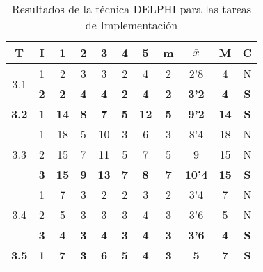 \documentclass[11pt,a4paper,spanish,twoside]{report}
\begin{document}
\begin{table}[!h]
\centering
  \begin{tabular}{|c|c||c|c|c|c|c||c|c|c||c|}
    \hline
    \textbf{T} & \textbf{I} & \textbf{1} &
    \textbf{2} & \textbf{3} & \textbf{4} & \textbf{5} & \textbf{m}
    &\textbf{$\bar{x}$} &\textbf{M} & \textbf{C}\\    
    \hline \hline
    \multirow{2}{*}{3.1}& 1 & 2 & 3 & 3 & 2 & 4 & 2 & 2'8 & 4 & N \\
    & \textbf{2} & \textbf{2} & \textbf{4} & \textbf{4} & \textbf{2} & \textbf{4} & \textbf{2} & \textbf{3'2} & \textbf{4} & \textbf{S} \\
    \hline

    \textbf{3.2} & \textbf{1} & \textbf{14} & \textbf{8} & \textbf{7} & \textbf{5} & \textbf{12} & \textbf{5} & \textbf{9'2} & \textbf{14} & \textbf{S} \\
    \hline

    \multirow{3}{*}{3.3}& 1 & 18 & 5 & 10 & 3 & 6 & 3 & 8'4 & 18 & N \\
    & 2 & 15 & 7 & 11 & 5 & 7 & 5 & 9 & 15 & N \\
    & \textbf{3} & \textbf{15} & \textbf{9} & \textbf{13} & \textbf{7} & \textbf{8} & \textbf{7} & \textbf{10'4} & \textbf{15} & \textbf{S} \\
    \hline

    \multirow{3}{*}{3.4}& 1 & 7 & 3 & 2 & 2 & 3 & 2 & 3'4 & 7 & N \\
    & 2 & 5 & 3 & 3 & 3 & 4 & 3 & 3'6 & 5 & N \\
    & \textbf{3} & \textbf{4} & \textbf{3} & \textbf{4} & \textbf{3} & \textbf{4} & \textbf{3} & \textbf{3'6} & \textbf{4} & \textbf{S} \\
    \hline

    \textbf{3.5} & \textbf{1} & \textbf{7} & \textbf{3} & \textbf{6} & \textbf{5} & \textbf{4} & \textbf{3} & \textbf{5} &\textbf{7} & \textbf{S} \\
    \hline

  \end{tabular}
  \caption{Resultados de la técnica DELPHI para las tareas de
    Implementación} \label{Tab:imp}
\end{table}
\end{document}
